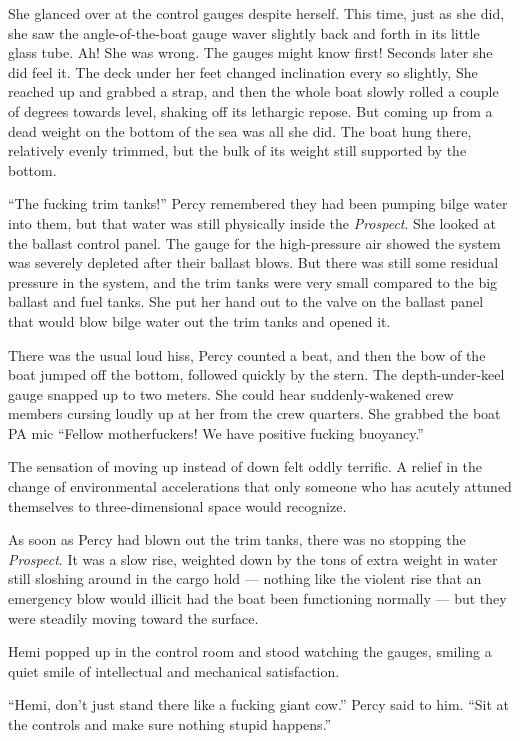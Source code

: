 \documentclass[
]{scrbook}
\begin{document}
She glanced over at the control gauges despite herself. This time, just
as she did, she saw the angle-of-the-boat gauge waver slightly back and
forth in its little glass tube. Ah! She was wrong. The gauges might know
first! Seconds later she did feel it. The deck under her feet changed
inclination every so slightly, She reached up and grabbed a strap, and
then the whole boat slowly rolled a couple of degrees towards level,
shaking off its lethargic repose. But coming up from a dead weight on
the bottom of the sea was all she did. The boat hung there, relatively
evenly trimmed, but the bulk of its weight still supported by the
bottom.

``The fucking trim tanks!'' Percy remembered they had been pumping bilge
water into them, but that water was still physically inside the
\emph{Prospect}. She looked at the ballast control panel. The gauge for
the high-pressure air showed the system was severely depleted after
their ballast blows. But there was still some residual pressure in the
system, and the trim tanks were very small compared to the big ballast
and fuel tanks. She put her hand out to the valve on the ballast panel
that would blow bilge water out the trim tanks and opened it.

There was the usual loud hiss, Percy counted a beat, and then the bow of
the boat jumped off the bottom, followed quickly by the stern. The
depth-under-keel gauge snapped up to two meters. She could hear
suddenly-wakened crew members cursing loudly up at her from the crew
quarters. She grabbed the boat PA mic ``Fellow motherfuckers! We have
positive fucking buoyancy.''

The sensation of moving up instead of down felt oddly terrific. A relief
in the change of environmental accelerations that only someone who has
acutely attuned themselves to three-dimensional space would recognize.

As soon as Percy had blown out the trim tanks, there was no stopping the
\emph{Prospect}. It was a slow rise, weighted down by the tons of extra
weight in water still sloshing around in the cargo hold --- nothing like
the violent rise that an emergency blow would illicit had the boat been
functioning normally --- but they were steadily moving toward the
surface.

Hemi popped up in the control room and stood watching the gauges,
smiling a quiet smile of intellectual and mechanical satisfaction.

``Hemi, don't just stand there like a fucking giant cow.'' Percy said to
him. ``Sit at the controls and make sure nothing stupid happens.''
\end{document}

